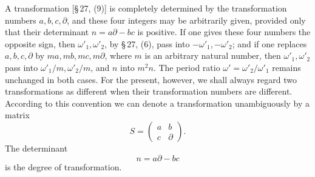 \documentclass[11pt]{article}
\begin{document}
A transformation [\S\,27, (9)] is completely determined by the transformation numbers $a,b,c,\partial$, and these four integers may be arbitrarily given, provided only that their determinant $n=a\partial-bc$ is positive. If one gives these four numbers the opposite sign, then $\omega'_1,\omega'_2$, by \S\,27, (6), pass into $-\omega'_1,-\omega'_2$; and if one replaces $a,b,c,\partial$ by $ma,mb,mc,m\partial$, where $m$ is an arbitrary natural number, then $\omega'_1,\omega'_2$ pass into $\omega'_1/m,\omega'_2/m$, and $n$ into $m^2n$. The period ratio $\omega'=\omega'_2/\omega'_1$ remains unchanged in both cases. For the present, however, we shall always regard two transformations as different when their transformation numbers are different. According to this convention we can denote a transformation unambiguously by a matrix
\begin{equation}
S=\begin{pmatrix}a&b\\ c&\partial\end{pmatrix}. \tag{1}
\end{equation}
The determinant
\begin{equation}
n=a\partial-bc \tag{2}
\end{equation}
is the degree of transformation.
\end{document}
